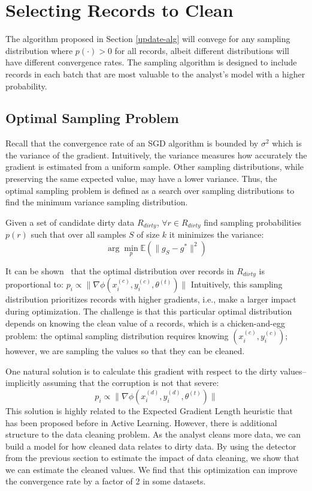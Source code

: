 \section{Selecting Records to Clean}\label{dist-samp}
The algorithm proposed in Section \ref{update-alg} will convege for 
any sampling distribution where  $p(\cdot) > 0$ for all records, albeit different distributions will have different convergence rates.
The sampling algorithm is designed to include records in each batch that are most valuable to the analyst's model with a higher probability.

\subsection{Optimal Sampling Problem}
Recall that the convergence rate of an SGD algorithm is bounded by $\sigma^2$ which is the variance of the gradient.
Intuitively, the variance measures how accurately the gradient is estimated from a uniform sample.
Other sampling distributions, while preserving the same expected value, may have a lower variance.
Thus, the optimal sampling problem is defined as a search over sampling distributions to find the minimum variance sampling distribution.

\begin{definition}
Given a set of candidate dirty data $R_{dirty}$, $\forall r \in R_{dirty}$ find sampling probabilities $p(r)$ such that over all samples $S$ of size $k$ it minimizes the variance:
\[
\arg\min_p \mathbb{E}(\|g_S - g^*\|^2)
\]
\end{definition}

It can be shown~\cite{zhao2014stochastic} that the optimal distribution over records in $R_{dirty}$ is proportional to: $p_i \propto \|\nabla\phi(x^{(c)}_i,y^{(c)}_i,\theta^{(t)})\|$
Intuitively, this sampling distribution prioritizes records with higher gradients, i.e., make a larger impact during optimization.
The challenge is that this particular optimal distribution depends on knowing the clean value of a records, which is a chicken-and-egg problem:
the optimal sampling distribution requires knowing $(x^{(c)}_i,y^{(c)}_i)$; however, we are sampling the values so that they can be cleaned.

One natural solution is to calculate this gradient with respect to the dirty values--implicitly assuming that the corruption is not that severe:
\[
p_i \propto \|\nabla\phi(x^{(d)}_i,y^{(d)}_i,\theta^{(t)})\|
\]
This solution is highly related to the Expected Gradient Length heuristic that has been proposed before in Active Learning\cite{settles2010active}.
However, there is additional structure to the data cleaning problem.
As the analyst cleans more data, we can build a model for how cleaned data relates to dirty data.
By using the detector from the previous section to estimate the impact of data cleaning, we show that we can estimate the cleaned values.
We find that this optimization can improve the convergence rate by a factor of 2 in some datasets.




